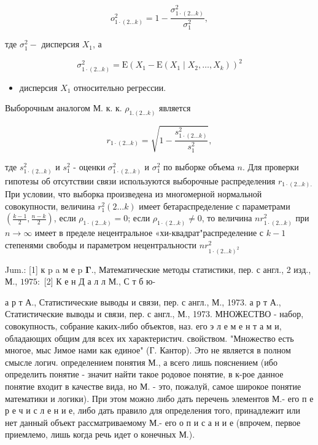 \documentclass[10pt]{article}
\begin{document}
\[

o_{1 \cdot(2 \ldots k)}^{2}=1-\frac{\sigma_{1 \cdot(2 \ldots k)}^{2}}{\sigma_{1}^{2}},

\]



тде $\sigma_{1}^{2}-$ дисперсия $X_{1}$, а



\[

\sigma_{1 \cdot(2 \ldots k)}^{2}=\mathrm{E}\left(X_{1}-\mathrm{E}\left(X_{1} \mid X_{2}, \ldots, X_{k}\right)\right)^{2}

\]



\begin{itemize}

  \item дисперсия $X_{1}$ относительно регрессии.

\end{itemize}



Выборочным аналогом М. к. к. $\rho_{1 .(2 \ldots k)}$ является



\[

r_{1 \cdot(2 \ldots k)}=\sqrt{1-\frac{s_{1 \cdot(2 \ldots k)}^{2}}{s_{1}^{2}}},

\]



тде $s_{1 \cdot(2 \ldots k)}^{2}$ и $s_{1}^{2}$ - оценки $\sigma_{1 \cdot(2 \ldots k)}^{2}$ и $\sigma_{1}^{2}$ по выборке объема $n$. Для проверки гипотезы об отсутствии связи используются выборочные распределения $r_{1 \cdot(2 \ldots k) .}$ При условии, что выборка произведена из многомерной нормальной совокупности, величина $r_{1}^{2}(2 \ldots k)$ имеет бетараспределение с параметрами $\left(\frac{k-1}{2}, \frac{n-k}{2}\right)$, если $\rho_{1 \cdot(2 \ldots k)}=0$; если $\rho_{1 \cdot(2 \ldots k)} \neq 0$, то величина $n r_{1 \cdot(2 \ldots k)}^{2}$ при $n \rightarrow \infty$ имеет в пределе нецентральное «хи-квадрат"распределение с $k-1$ степенями свободы и параметром нецентральности $n r_{1 \cdot(2 \ldots k)^{2}}^{2}$



Jum.: [1] к p a м е p $\boldsymbol{\Gamma} .$, Математические методы статистики, пер. с англ., 2 изд., М., $1975:$ [2] К е н Д а л л М., С т б ю-

а р т А., Статистические выводы и связи, пер. с англ., М., 1973. а р т А., Статистические выводы и связи, пер. с англ., М., 1973. МНОЖЕСТВО - набор, совокупность, собрание каких-либо объектов, наз. его э л е м е н т а м и, обладающих общим для всех их характеристич. свойством. "Множество есть многое, мыс Јимое нами как единое" (Г. Кантор). Это не является в полном смысле логич. определением понятия М., а всего лишь пояснением (ибо определить понятие - значит найти такое родовое понятие, в к-рое данное понятие входит в качестве вида, но М. - это, пожалуй, самое широкое понятие математики и логики). При этом можно либо дать перечень элементов М.- его п е р е ч и с л е н и е, либо дать правило для определения того, принадлежит или нет данный объект рассматриваемому М.- его о п и с а н и е (впрочем, первое приемлемо, лишь когда речь идет о конечных М.).
\end{document}
